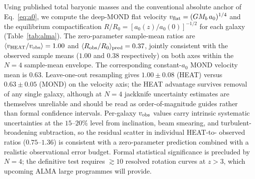 \documentclass[twocolumn,letterpaper]{aastex631}
\newcommand{\azero}{a_0}
\newcommand{\heat}{\mathrm{HEAT}}
\begin{document}
Using published total baryonic masses and the conventional
absolute anchor of Eq.~\ref{eq:a0}, we compute the deep-MOND flat velocity
$v_{\rm flat}=(GM_b\,\azero)^{1/4}$ and the equilibrium
compactification $R/R_{0}=[\azero(z)/\azero(0)]^{-1/2}$ for
each galaxy (Table~\ref{tab:alma}).  The zero-parameter
sample-mean ratios are
$\langle v_{\heat}/v_{\rm obs}\rangle=1.00$ and
$\langle R_{\rm obs}/R_{0}\rangle_{\rm pred}=0.37$, jointly
consistent with the observed sample means ($1.00$ and $0.38$
respectively) on both axes within the $N{=}4$ sample-mean
envelope.  The corresponding constant-$\azero$ MOND
velocity mean is $0.63$.  Leave-one-out resampling gives
$1.00\pm 0.08$ (HEAT) versus $0.63\pm 0.05$ (MOND) on the
velocity axis; the HEAT advantage survives removal of any
single galaxy, although at $N\!=\!4$ jackknife uncertainty
estimates are themselves unreliable and should be read as
order-of-magnitude guides rather than formal confidence
intervals.  Per-galaxy $v_{\rm obs}$ values carry
intrinsic systematic uncertainties at the $15$--$20\%$ level
from inclination, beam smearing, and turbulent-broadening
subtraction, so the residual scatter in individual HEAT-to-
observed ratios ($0.75$--$1.36$) is consistent with a
zero-parameter prediction combined with a realistic
observational error budget.  Formal statistical significance
is precluded by $N=4$; the definitive test requires
$\gtrsim 10$ resolved rotation curves at $z>3$, which
upcoming ALMA large programmes will provide.
\end{document}
